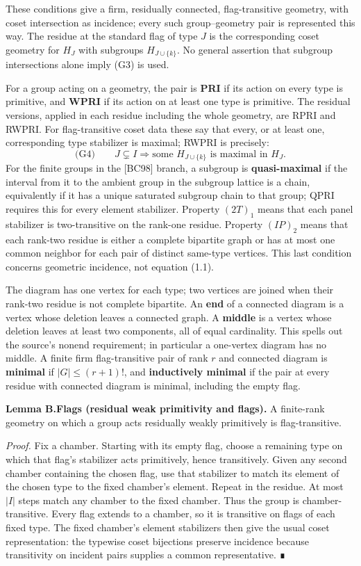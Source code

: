 \documentclass[
  11pt,
  a4paper,
]{article}
\begin{document}
These conditions give a firm, residually connected, flag-transitive
geometry, with coset intersection as incidence; every such
group--geometry pair is represented this way. The residue at the
standard flag of type \(J\) is the corresponding coset geometry for
\(H_J\) with subgroups \(H_{J\cup\{k\}}\). No general assertion that
subgroup intersections alone imply (G3) is used.

For a group acting on a geometry, the pair is \textbf{PRI} if its action
on every type is primitive, and \textbf{WPRI} if its action on at least
one type is primitive. The residual versions, applied in each residue
including the whole geometry, are RPRI and RWPRI. For flag-transitive
coset data these say that every, or at least one, corresponding type
stabilizer is maximal; RWPRI is precisely: \[
\text{(G4)}\qquad J\subsetneq I\Longrightarrow
 \text{some }H_{J\cup\{k\}}\text{ is maximal in }H_J.
\] For the finite groups in the {[}BC98{]} branch, a subgroup is
\textbf{quasi-maximal} if the interval from it to the ambient group in
the subgroup lattice is a chain, equivalently if it has a unique
saturated subgroup chain to that group; QPRI requires this for every
element stabilizer. Property \((2T)_1\) means that each panel stabilizer
is two-transitive on the rank-one residue. Property \((IP)_2\) means
that each rank-two residue is either a complete bipartite graph or has
at most one common neighbor for each pair of distinct same-type
vertices. This last condition concerns geometric incidence, not equation
(1.1).

The diagram has one vertex for each type; two vertices are joined when
their rank-two residue is not complete bipartite. An \textbf{end} of a
connected diagram is a vertex whose deletion leaves a connected graph. A
\textbf{middle} is a vertex whose deletion leaves at least two
components, all of equal cardinality. This spells out the source's
nonend requirement; in particular a one-vertex diagram has no middle. A
finite firm flag-transitive pair of rank \(r\) and connected diagram is
\textbf{minimal} if \(|G|\leq(r+1)!\), and \textbf{inductively minimal}
if the pair at every residue with connected diagram is minimal,
including the empty flag.

\textbf{Lemma B.Flags (residual weak primitivity and flags).} A
finite-rank geometry on which a group acts residually weakly primitively
is flag-transitive.

\emph{Proof.} Fix a chamber. Starting with its empty flag, choose a
remaining type on which that flag's stabilizer acts primitively, hence
transitively. Given any second chamber containing the chosen flag, use
that stabilizer to match its element of the chosen type to the fixed
chamber's element. Repeat in the residue. At most \(|I|\) steps match
any chamber to the fixed chamber. Thus the group is chamber-transitive.
Every flag extends to a chamber, so it is transitive on flags of each
fixed type. The fixed chamber's element stabilizers then give the usual
coset representation: the typewise coset bijections preserve incidence
because transitivity on incident pairs supplies a common representative.
∎
\end{document}
